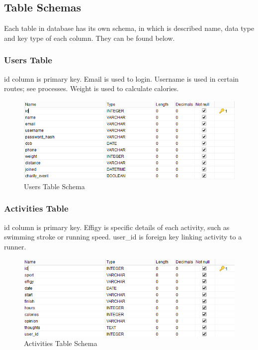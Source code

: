 \documentclass{article}[12pt,a4paper]
\begin{document}
\clearpage

\subsection{Table Schemas}
Each table in database has its own schema, in which is described name, data type and key type of each column. They can be found below.

\subsubsection{Users Table}
id column is primary key. Email is used to login. Username is used in certain routes; see processes. Weight is used to calculate calories.
\begin{figure}[h!]
  \includegraphics[scale=0.65]{images/database/users_schema}
  \caption{Users Table Schema}
\end{figure}

\subsubsection{Activities Table}
id column is primary key. Effigy is specific details of each activity, such as swimming stroke or running speed. user\_id is foreign key linking activity to a runner.
\begin{figure}[h!]
  \includegraphics[scale=0.65]{images/database/activities_schema}
  \caption{Activities Table Schema}
\end{figure}
\end{document}

